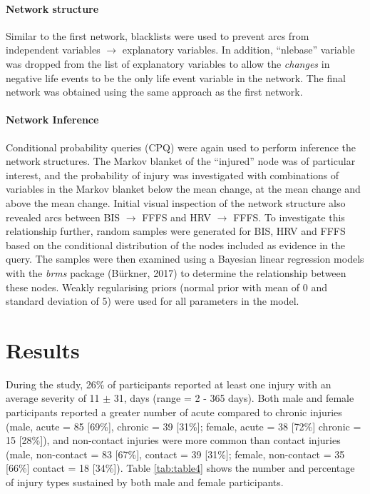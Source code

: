 \documentclass[
  english,
  man]{apa6}
\let\oldparagraph\paragraph
\renewcommand{\paragraph}[1]{\oldparagraph{#1}\mbox{}}
\begin{document}
\hypertarget{network-structure-1}{%
\paragraph{Network structure}\label{network-structure-1}}

Similar to the first network, blacklists were used to prevent arcs from independent variables \(\rightarrow\) explanatory variables.
In addition, ``nlebase'' variable was dropped from the list of explanatory variables to allow the \emph{changes} in negative life events to be the only life event variable in the network.
The final network was obtained using the same approach as the first network.

\hypertarget{network-inference-1}{%
\paragraph{Network Inference}\label{network-inference-1}}

Conditional probability queries (CPQ) were again used to perform inference the network structures.
The Markov blanket of the ``injured'' node was of particular interest, and the probability of injury was investigated with combinations of variables in the Markov blanket below the mean change, at the mean change and above the mean change.
Initial visual inspection of the network structure also revealed arcs between BIS \(\rightarrow\) FFFS and HRV \(\rightarrow\) FFFS.
To investigate this relationship further, random samples were generated for BIS, HRV and FFFS based on the conditional distribution of the nodes included as evidence in the query.
The samples were then examined using a Bayesian linear regression models with the \emph{brms} package (Bürkner, 2017) to determine the relationship between these nodes.
Weakly regularising priors (normal prior with mean of 0 and standard deviation of 5) were used for all parameters in the model.

\hypertarget{results}{%
\section{Results}\label{results}}

During the study, 26\% of participants reported at least one injury with an average severity of 11 \(\pm\) 31, days (range = 2 - 365 days).
Both male and female participants reported a greater number of acute compared to chronic injuries (male, acute = 85 {[}69\%{]}, chronic = 39 {[}31\%{]}; female, acute = 38 {[}72\%{]} chronic = 15 {[}28\%{]}), and non-contact injuries were more common than contact injuries (male, non-contact = 83 {[}67\%{]}, contact = 39 {[}31\%{]}; female, non-contact = 35 {[}66\%{]} contact = 18 {[}34\%{]}).
Table \ref{tab:table4} shows the number and percentage of injury types sustained by both male and female participants.
\end{document}
